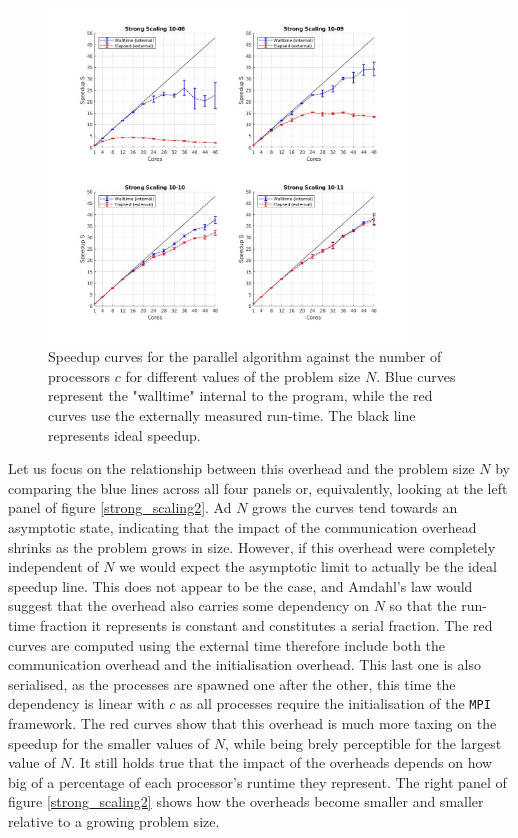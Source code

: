 \documentclass{article}
\begin{document}
\begin{figure}[h]
\centering
\includegraphics[width=0.85\textwidth]{strong_scaling1}
\caption{ Speedup curves for the parallel algorithm against the number of processors $c$ for different values of the problem size $N$. Blue curves represent the "walltime" internal to the program, while the red curves use the externally measured run-time. The black line represents ideal speedup.}
\label{strong_scaling1}
\end{figure}

\par
Let us focus on the relationship between this overhead and the problem size $N$ by comparing the blue lines across all four panels or, equivalently, looking at the left panel of figure \ref{strong_scaling2}. Ad $N$ grows the curves tend towards an asymptotic state, indicating that the impact of the communication overhead shrinks as the problem grows in size. However, if this overhead were completely independent of $N$ we would expect the asymptotic limit to actually be the ideal speedup line. This does not appear to be the case, and Amdahl's law would suggest that the overhead also carries some dependency on $N$ so that the run-time fraction it represents is constant and constitutes a serial fraction.
The red curves are computed using the external time therefore include both the communication overhead and the initialisation overhead. This last one is also serialised, as the processes are spawned one after the other, this time the dependency is linear with $c$ as all processes require the initialisation of the \verb|MPI| framework. The red curves show that this overhead is much more taxing on the speedup for the smaller values of $N$, while being brely perceptible for the largest value of $N$. It still holds true that the impact of the overheads depends on how big of a percentage of each processor's runtime they represent. The right panel of figure \ref{strong_scaling2} shows how the overheads become smaller and smaller relative to a growing problem size.
\end{document}
